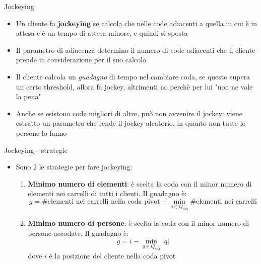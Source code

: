 \begin{frame}{Jockeying}
	\begin{itemize}
		\item Un cliente fa \textbf{jockeying} se calcola che nelle code adiacenti a quella in cui è in attesa c'è un tempo di attesa minore, e quindi si sposta
		\item Il parametro di adiacenza determina il numero di code adiacenti che il cliente prende in considerazione per il suo calcolo
		\item Il cliente calcola un \textit{guadagno} di tempo nel cambiare coda, se questo supera un certo threshold, allora fa jockey, altrimenti no perchè per lui "non ne vale la pena"
		\item Anche se esistono code migliori di altre, può non avvenire il jockey: viene estratto un parametro che rende il jockey aleatorio, in quanto non tutte le persone lo fanno
	\end{itemize}
\end{frame}

\begin{frame}{Jockeying - strategie}
	\begin{itemize}
		\item Sono 2 le strategie per fare jockeying: 
		\begin{enumerate}
			\item \textbf{Minimo numero di elementi}: è scelta la coda con il minor numero di elementi nei carrelli di tutti i clienti. Il guadagno è:
			\[g = \# \text{elementi nei carrelli nella coda pivot} - \min\limits_{q \in Q_{adj}} \# \text{elementi nei carrelli}\]
			\item \textbf{Minimo numero di persone}: è scelta la coda con il minor numero di persone accodate. Il guadagno è:
			\[g = i - \min\limits_{q \in Q_{adj}} |q|\]
			dove $i$ è la posizione del cliente nella coda pivot
		\end{enumerate}
	\end{itemize}
\end{frame}